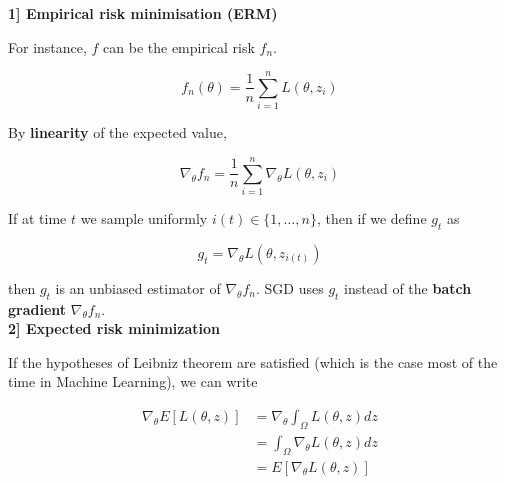 \documentclass[
10pt, %
a4paper, %
oneside, %
headinclude,footinclude, %
BCOR5mm, %
]{scrartcl}
\begin{document}
\textbf{{1] Empirical risk minimisation (ERM)}}

For instance, $f$ can be the empirical risk $f_n$.

\begin{equation*}
    f_n(\theta) =  \frac{1}{n} \sum^{n}_{i=1} L(\theta, z_i)
\end{equation*}

By \textbf{{linearity}} of the expected value,

\begin{equation}
    \label{eq:sgdest}
    \nabla_{\theta}f_n = \frac{1}{n} \sum^{n}_{i=1} \nabla_{\theta}L(\theta, z_i)
\end{equation}

If at time $t$ we sample uniformly $i(t)\in \{1, \dots, n\}$, then if we define $g_t$ as

\begin{equation*}
    g_t = \nabla_{\theta}L(\theta, z_{i(t)})
\end{equation*}

then $g_t$ is an unbiased estimator of $\nabla_{\theta}f_n$. SGD uses $g_t$ instead of the \textbf{{batch gradient}} $\nabla_{\theta}f_n$.
\\

\textbf{{2] Expected risk minimization}} 

% 
% 
% 
% 
If the hypotheses of Leibniz theorem are satisfied (which is the case most of the time in Machine Learning), we can write

\begin{equation*}
    \begin{aligned}
	\nabla_{\theta}E[L(\theta, z)]&= \nabla_{\theta} \int_{\Omega} L(\theta, z) dz\\
	&= \int_{\Omega} \nabla_{\theta}L(\theta, z) dz\\
	&= E[\nabla_{\theta}L(\theta, z)]
    \end{aligned}
\end{equation*}
\end{document}
